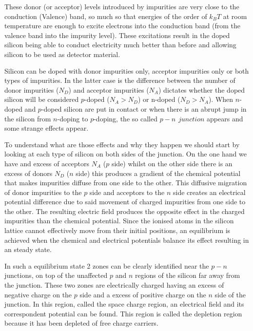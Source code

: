 These donor (or acceptor) levels introduced by impurities are very close to the conduction (Valence) band, so much so that energies of the order of $k_B T$ at room temperature are enough to excite electrons into the conduction band (from the valence band into the impurity level). These excitations result in the doped silicon being able to conduct electricity much better than before and allowing silicon to be used as detector material.

Silicon can be doped with donor impurities only, acceptor impurities only or both types of impurities. In the latter case is the difference between the number of donor impurities ($N_D$) and acceptor impurities ($N_A$) dictates whether the doped silicon will be considered $p$-doped ($N_A > N_D $) or n-doped ($N_D > N_A$). When $n$-doped and $p$-doped silicon are put in contact or when there is an abrupt jump in the silicon from $n$-doping to $p$-doping, the so called $p-n \hspace{5pt} junction$ appears and some strange effects appear.

To understand what are those effects and why they happen we should start by looking at each type of silicon on both sides of the junction. On the one hand we have and excess of acceptors $N_A$ ($p$ side) whilst on the other side there is an excess of donors $N_D$ ($n$ side) this produces a gradient of the chemical potential that makes impurities diffuse from one side to the other. This diffusive migration of donor impurities to the $p$ side and acceptors to the $n$ side creates an electrical potential difference due to said movement of charged impurities from one side to the other. The resulting electric field produces the opposite effect in the charged impurities than the chemical potential. Since the ionised atoms in the silicon lattice cannot effectively move from their initial positions, an equilibrium is achieved when the chemical and electrical potentials balance its effect resulting in an steady state. 

In such a equilibrium state 2 zones can be clearly identified near the $p-n$ junctions, on top of the unaffected $p$ and $n$ regions of the silicon far away from the junction. These two zones are electrically charged having an excess of negative charge on the $p$ side and a excess of positive charge on the $n$ side of the junction. In this region, called the space charge region, an electrical field and its correspondent potential can be found. This region is called the depletion region because it has been depleted of free charge carriers.

